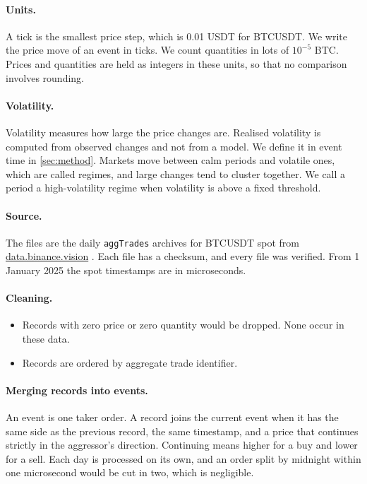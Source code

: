 \documentclass[11pt]{article}
\begin{document}
\paragraph{Units.}
A tick is the smallest price step, which is 0.01 USDT for BTCUSDT.
We write the price move of an event in ticks.
We count quantities in lots of $10^{-5}$ BTC.
Prices and quantities are held as integers in these units, so that no comparison involves rounding.

\paragraph{Volatility.}
Volatility measures how large the price changes are.
Realised volatility is computed from observed changes and not from a model.
We define it in event time in \cref{sec:method}.
Markets move between calm periods and volatile ones, which are called regimes, and large changes tend to cluster together.
We call a period a high-volatility regime when volatility is above a fixed threshold.

\paragraph{Source.}
The files are the daily \texttt{aggTrades} archives for BTCUSDT spot from \url{data.binance.vision} \citep{binance}.
Each file has a checksum, and every file was verified.
From 1 January 2025 the spot timestamps are in microseconds.

\paragraph{Cleaning.}
\begin{itemize}
  \item Records with zero price or zero quantity would be dropped. None occur in these data.
  \item Records are ordered by aggregate trade identifier.
\end{itemize}

\paragraph{Merging records into events.}
An event is one taker order.
A record joins the current event when it has the same side as the previous record, the same timestamp, and a price that continues strictly in the aggressor's direction.
Continuing means higher for a buy and lower for a sell.
Each day is processed on its own, and an order split by midnight within one microsecond would be cut in two, which is negligible.
\end{document}
